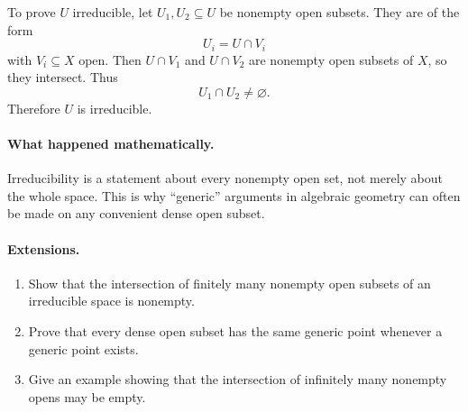 To prove \(U\) irreducible, let \(U_1,U_2\subseteq U\) be nonempty open subsets.  They are
of the form
\[
U_i=U\cap V_i
\]
with \(V_i\subseteq X\) open.  Then \(U\cap V_1\) and \(U\cap V_2\) are nonempty open
subsets of \(X\), so they intersect.  Thus
\[
U_1\cap U_2\neq\varnothing.
\]
Therefore \(U\) is irreducible.

\paragraph{What happened mathematically.}
Irreducibility is a statement about every nonempty open set, not merely about the
whole space.  This is why ``generic'' arguments in algebraic geometry can often be made on
any convenient dense open subset.

\paragraph{Extensions.}
\begin{enumerate}
\item Show that the intersection of finitely many nonempty open subsets of an irreducible
space is nonempty.
\item Prove that every dense open subset has the same generic point whenever a generic point
exists.
\item Give an example showing that the intersection of infinitely many nonempty opens may be
empty.
\end{enumerate}
\fi
